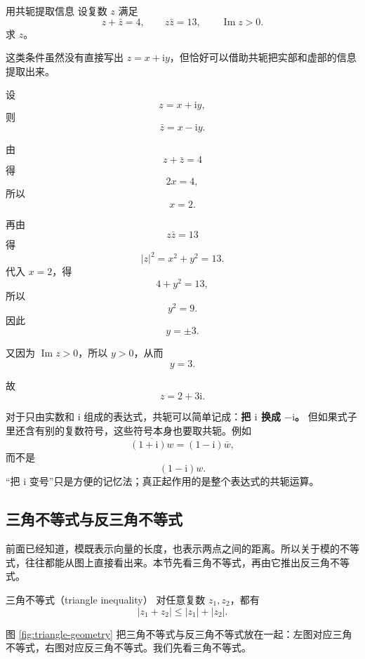 \begin{lizi}{用共轭提取信息}{}
设复数 $z$ 满足
\[
z+\bar z=4,\qquad z\bar z=13,\qquad \operatorname{Im}z>0.
\]
求 $z$。

\begin{jie}
这类条件虽然没有直接写出 $z=x+\mathrm{i}y$，但恰好可以借助共轭把实部和虚部的信息提取出来。

设
\[
z=x+\mathrm{i}y,
\]
则
\[
\bar z=x-\mathrm{i}y.
\]

由
\[
z+\bar z=4
\]
得
\[
2x=4,
\]
所以
\[
x=2.
\]

再由
\[
z\bar z=13
\]
得
\[
|z|^2=x^2+y^2=13.
\]
代入 $x=2$，得
\[
4+y^2=13,
\]
所以
\[
y^2=9.
\]
因此
\[
y=\pm 3.
\]

又因为 $\operatorname{Im}z>0$，所以 $y>0$，从而
\[
y=3.
\]

故
\[
z=2+3\mathrm{i}.
\]
\end{jie}
\end{lizi}

\begin{tishi}[共轭的记忆法与适用范围]
对于只由实数和 $\mathrm{i}$ 组成的表达式，共轭可以简单记成：\textbf{把 $\mathrm{i}$ 换成 $-\mathrm{i}$。} 但如果式子里还含有别的复数符号，这些符号本身也要取共轭。例如
\[
\overline{(1+\mathrm{i})w}=(1-\mathrm{i})\bar w,
\]
而不是
\[
(1-\mathrm{i})w.
\]
``把 $\mathrm{i}$ 变号''只是方便的记忆法；真正起作用的是整个表达式的共轭运算。
\end{tishi}

\subsection{三角不等式与反三角不等式}

前面已经知道，模既表示向量的长度，也表示两点之间的距离。所以关于模的不等式，往往都能从图上直接看出来。本节先看三角不等式，再由它推出反三角不等式。

\begin{dingli}{三角不等式（triangle inequality）}{}
对任意复数 $z_1,z_2$，都有
\begin{equation}\label{eq:triangle-inequality}
    |z_1+z_2|\le |z_1|+|z_2|.
\end{equation}
\end{dingli}

图 \ref{fig:triangle-geometry} 把三角不等式与反三角不等式放在一起：左图对应三角不等式，右图对应反三角不等式。我们先看三角不等式。

